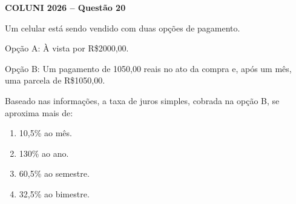 \textbf{COLUNI 2026 -- Questão 20}\par\medskip Um celular está sendo vendido com duas opções de pagamento.

Opção A: À vista por R\$2000,00.

Opção B: Um pagamento de 1050,00 reais no ato da compra e, após um mês, uma parcela de R\$1050,00.

Baseado nas informações, a taxa de juros simples, cobrada na opção B, se aproxima mais de:
\begin{enumerate}
\item 10,5\% ao mês.
\item 130\% ao ano.
\item 60,5\% ao semestre.
\item 32,5\% ao bimestre.
\end{enumerate}

